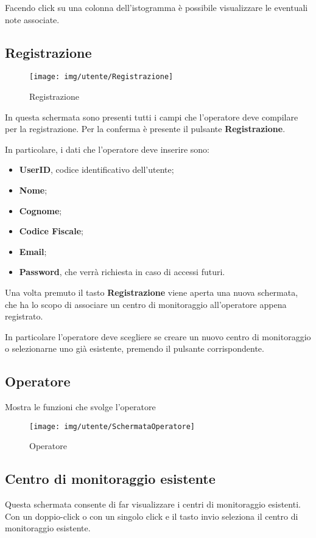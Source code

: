 Facendo click su una colonna dell'istogramma è possibile visualizzare le eventuali note associate.

\subsection{Registrazione}

\begin{figure}[h]
	\centering
	\texttt{[image: img/utente/Registrazione]}
	\caption{Registrazione}
	\label{fig:registrazione}
\end{figure}

In questa schermata sono presenti tutti i campi che l'operatore deve compilare per la registrazione. Per la conferma è presente il pulsante \textbf{Registrazione}.

In particolare, i dati che l'operatore deve inserire sono:
\begin{itemize}
	\item  \textbf{UserID}, codice identificativo dell'utente;
	\item  \textbf{Nome};
	\item  \textbf{Cognome};
	\item  \textbf{Codice Fiscale};
	\item  \textbf{Email};
	\item  \textbf{Password}, che verrà richiesta in caso di accessi futuri.
\end{itemize}
Una volta premuto il tasto \textbf{Registrazione} viene aperta una nuova schermata, che ha lo scopo di associare un centro di monitoraggio all'operatore appena registrato.

In particolare l'operatore deve scegliere se creare un nuovo centro di monitoraggio o selezionarne uno già esistente, premendo il pulsante corrispondente.

\subsection{Operatore}
Mostra le funzioni che svolge l'operatore 
\begin{figure}[h]
	\centering
	\texttt{[image: img/utente/SchermataOperatore]}
	\caption{Operatore}
	\label{fig:schermataoperatore}
\end{figure}

\pagebreak

\subsection{Centro di monitoraggio esistente}
Questa schermata consente di far visualizzare i centri di monitoraggio esistenti.
Con un doppio-click o con un singolo click e il tasto invio seleziona il centro di monitoraggio esistente.

